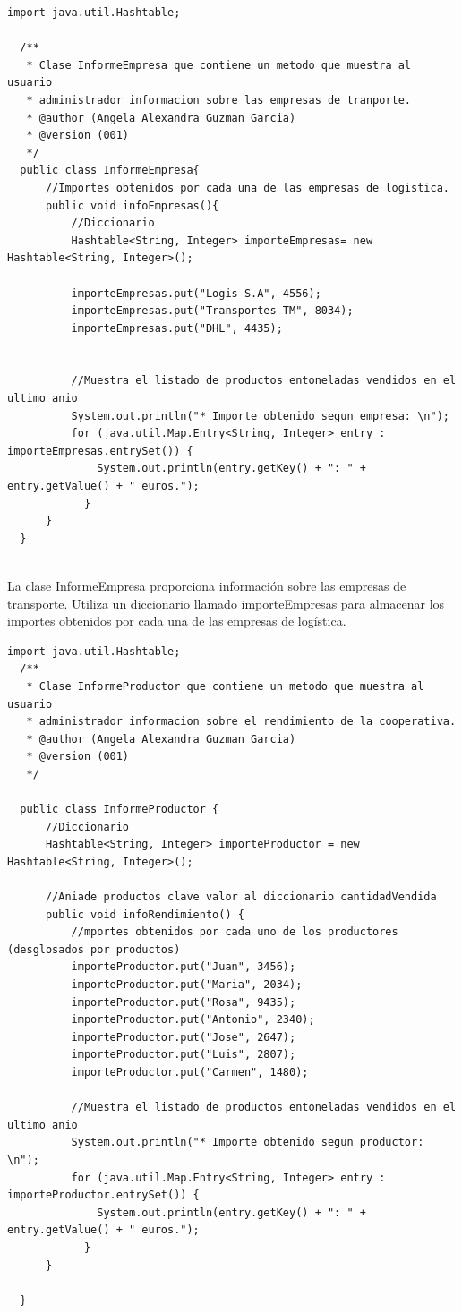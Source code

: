 \documentclass[10pt,a4paper]{article}
\def\StartLineAt#1{\lstset{firstnumber=#1}}
\begin{document}
\StartLineAt{28}
\begin{lstlisting}[style=Java]
  import java.util.Hashtable;

  /**
   * Clase InformeEmpresa que contiene un metodo que muestra al usuario
   * administrador informacion sobre las empresas de tranporte.
   * @author (Angela Alexandra Guzman Garcia) 
   * @version (001)
   */
  public class InformeEmpresa{
      //Importes obtenidos por cada una de las empresas de logistica.
      public void infoEmpresas(){
          //Diccionario  
          Hashtable<String, Integer> importeEmpresas= new Hashtable<String, Integer>(); 
          
          importeEmpresas.put("Logis S.A", 4556);
          importeEmpresas.put("Transportes TM", 8034);
          importeEmpresas.put("DHL", 4435);
          
          
          //Muestra el listado de productos entoneladas vendidos en el ultimo anio
          System.out.println("* Importe obtenido segun empresa: \n");
          for (java.util.Map.Entry<String, Integer> entry : importeEmpresas.entrySet()) {
              System.out.println(entry.getKey() + ": " + entry.getValue() + " euros.");
            }
      }
  }
  
\end{lstlisting}

La clase InformeEmpresa proporciona información sobre las empresas de transporte. Utiliza un diccionario llamado importeEmpresas para almacenar los importes obtenidos por cada una de las empresas de logística.


\StartLineAt{1}
\begin{lstlisting}[style=Java]
  import java.util.Hashtable;
  /**
   * Clase InformeProductor que contiene un metodo que muestra al usuario
   * administrador informacion sobre el rendimiento de la cooperativa.
   * @author (Angela Alexandra Guzman Garcia) 
   * @version (001)
   */
  
  public class InformeProductor {
      //Diccionario  
      Hashtable<String, Integer> importeProductor = new Hashtable<String, Integer>();
  
      //Aniade productos clave valor al diccionario cantidadVendida
      public void infoRendimiento() {
          //mportes obtenidos por cada uno de los productores (desglosados por productos)
          importeProductor.put("Juan", 3456);
          importeProductor.put("Maria", 2034);
          importeProductor.put("Rosa", 9435);
          importeProductor.put("Antonio", 2340);
          importeProductor.put("Jose", 2647);
          importeProductor.put("Luis", 2807);
          importeProductor.put("Carmen", 1480);
          
          //Muestra el listado de productos entoneladas vendidos en el ultimo anio
          System.out.println("* Importe obtenido segun productor: \n");
          for (java.util.Map.Entry<String, Integer> entry : importeProductor.entrySet()) {
              System.out.println(entry.getKey() + ": " + entry.getValue() + " euros.");
            }
      }
      
  }
  
\end{lstlisting}
\end{document}
